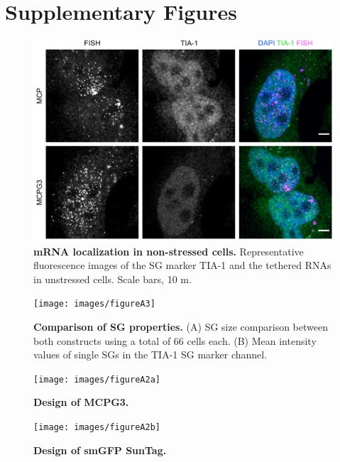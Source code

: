 \chapter{Supplementary Figures}

\begin{figure}[h]
    \centering
    \includegraphics[width=\linewidth]{images/figureA1}
    \caption{\textbf{mRNA localization in non-stressed cells.}
            Representative fluorescence images of the SG marker
            TIA-1 and the tethered RNAs in unstressed cells.
            Scale bars, 10 \textmu m.}
    \label{fig:mcp_supplement}
\end{figure}

\begin{figure}[h]
    \centering
    \texttt{[image: images/figureA3]}
    \caption{\textbf{Comparison of SG properties.}
            (A) SG size comparison between both constructs using a total of 66 cells each.
            (B) Mean intensity values of single SGs in the TIA-1 SG marker channel.}
    \label{fig:mcp_granules}
\end{figure}
\pagebreak

\begin{figure}[h]
    \centering
    \texttt{[image: images/figureA2a]}
    \caption{\textbf{Design of MCPG3.}}
    \label{fig:plasmid_1}
\end{figure}

\begin{figure}[h]
    \centering
    \texttt{[image: images/figureA2b]}
    \caption{\textbf{Design of smGFP SunTag.}}
    \label{fig:plasmid_2}
\end{figure}
